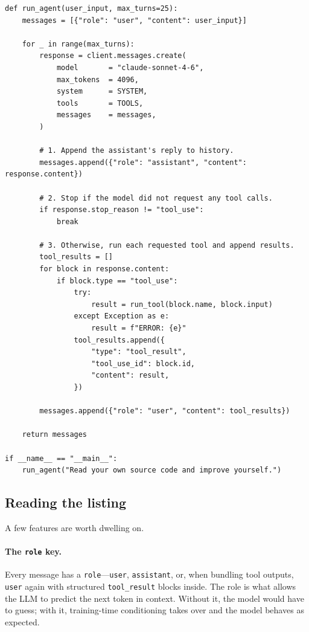 \begin{lstlisting}
def run_agent(user_input, max_turns=25):
    messages = [{"role": "user", "content": user_input}]

    for _ in range(max_turns):
        response = client.messages.create(
            model       = "claude-sonnet-4-6",
            max_tokens  = 4096,
            system      = SYSTEM,
            tools       = TOOLS,
            messages    = messages,
        )

        # 1. Append the assistant's reply to history.
        messages.append({"role": "assistant", "content": response.content})

        # 2. Stop if the model did not request any tool calls.
        if response.stop_reason != "tool_use":
            break

        # 3. Otherwise, run each requested tool and append results.
        tool_results = []
        for block in response.content:
            if block.type == "tool_use":
                try:
                    result = run_tool(block.name, block.input)
                except Exception as e:
                    result = f"ERROR: {e}"
                tool_results.append({
                    "type": "tool_result",
                    "tool_use_id": block.id,
                    "content": result,
                })

        messages.append({"role": "user", "content": tool_results})

    return messages

if __name__ == "__main__":
    run_agent("Read your own source code and improve yourself.")
\end{lstlisting}

\subsection{Reading the listing}

A few features are worth dwelling on.

\paragraph{The \texttt{role} key.}
Every message has a \texttt{role}---\texttt{user},
\texttt{assistant}, or, when bundling tool outputs, \texttt{user}
again with structured \texttt{tool\_result} blocks inside.
The role is what allows the LLM to predict the next token in
context.  Without it, the model would have to guess; with it,
training-time conditioning takes over and the model behaves
as expected.


